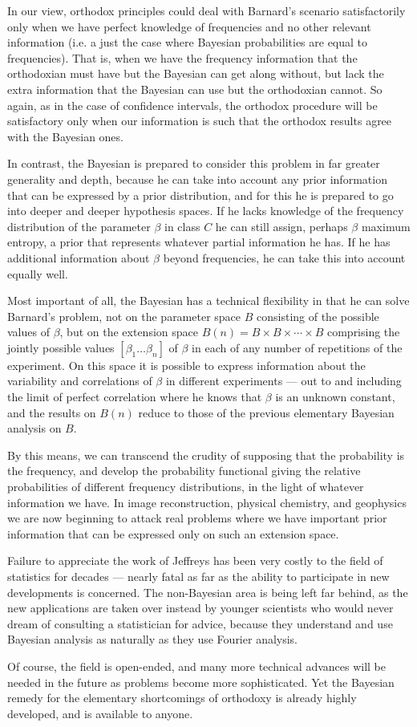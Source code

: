 \documentclass[12pt]{article}
\begin{document}
In our view, orthodox principles could deal with Barnard's scenario satisfactorily only when we have perfect knowledge of frequencies and no other relevant information (i.e. a just the case where Bayesian probabilities are equal to frequencies). That is, when we have the frequency information that the orthodoxian must have but the Bayesian can get along without, but lack the extra information that the Bayesian can use but the orthodoxian cannot. So again, as in the case of confidence intervals, the orthodox procedure will be satisfactory only when our information is such that the orthodox results agree with the Bayesian ones.

In contrast, the Bayesian is prepared to consider this problem in far greater generality and depth, because he can take into account any prior information that can be expressed by a prior distribution, and for this he is prepared to go into deeper and deeper hypothesis spaces. If he lacks knowledge of the frequency distribution of the parameter $\beta$ in class $C$ he can still assign, perhaps $\beta$ maximum entropy, a prior that represents whatever partial information he has. If he has additional information about $\beta$ beyond frequencies, he can take this into account equally well.

Most important of all, the Bayesian has a technical flexibility in that he can solve Barnard's problem, not on the parameter space $B$ consisting of the possible values of $\beta$, but on the extension space $B(n)=B \times B \times \cdots \times B$ comprising the jointly possible values $[\beta_1 \ldots \beta_n]$ of $\beta$ in each of any number of repetitions of the experiment. On this space it is possible to express information about the variability and correlations of $\beta$ in different experiments --- out to and including the limit of perfect correlation where he knows that $\beta$ is an unknown constant, and the results on $B(n)$ reduce to those of the previous elementary Bayesian analysis on $B$.

By this means, we can transcend the crudity of supposing that the probability is the frequency, and develop the probability functional giving the relative probabilities of different frequency distributions, in the light of whatever information we have. In image reconstruction, physical chemistry, and geophysics we are now beginning to attack real problems where we have important prior information that can be expressed only on such an extension space.

Failure to appreciate the work of Jeffreys has been very costly to the field of statistics for decades --- nearly fatal as far as the ability to participate in new developments is concerned. The non-Bayesian area is being left far behind, as the new applications are taken over instead by younger scientists who would never dream of consulting a statistician for advice, because they understand and use Bayesian analysis as naturally as they use Fourier analysis.

Of course, the field is open-ended, and many more technical advances will be needed in the future as problems become more sophisticated. Yet the Bayesian remedy for the elementary shortcomings of orthodoxy is already highly developed, and is available to anyone.
\end{document}
